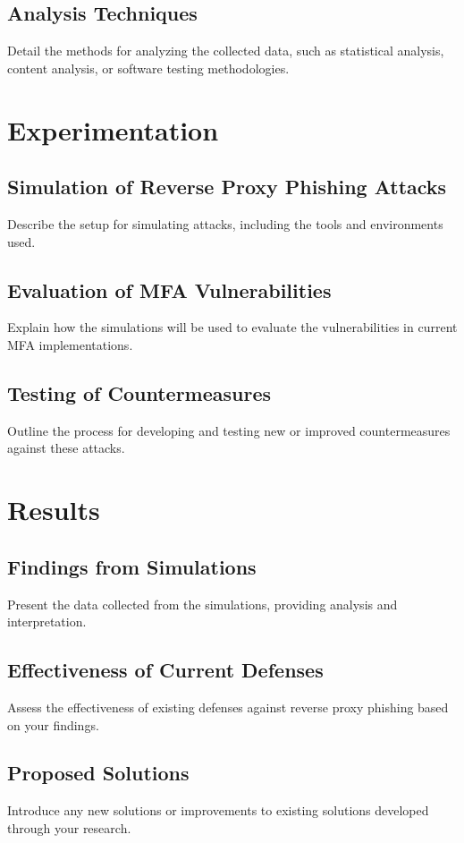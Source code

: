 \documentclass [14pt]{extarticle}
\begin{document}
\subsection{Analysis Techniques}
Detail the methods for analyzing the collected data, such as statistical analysis, content analysis, or software testing methodologies.

\section{Experimentation}
\subsection{Simulation of Reverse Proxy Phishing Attacks}
Describe the setup for simulating attacks, including the tools and environments used.
\subsection{Evaluation of MFA Vulnerabilities}
Explain how the simulations will be used to evaluate the vulnerabilities in current MFA implementations.
\subsection{Testing of Countermeasures}
Outline the process for developing and testing new or improved countermeasures against these attacks.

\section{Results}
\subsection{Findings from Simulations}
Present the data collected from the simulations, providing analysis and interpretation.
\subsection{Effectiveness of Current Defenses}
Assess the effectiveness of existing defenses against reverse proxy phishing based on your findings.
\subsection{Proposed Solutions}
Introduce any new solutions or improvements to existing solutions developed through your research.
\end{document}
